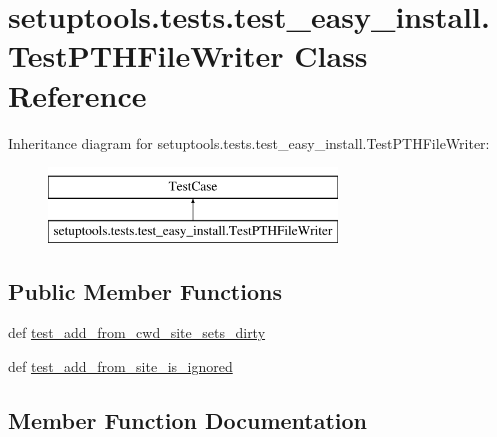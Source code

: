 \hypertarget{classsetuptools_1_1tests_1_1test__easy__install_1_1TestPTHFileWriter}{}\section{setuptools.\+tests.\+test\+\_\+easy\+\_\+install.\+Test\+P\+T\+H\+File\+Writer Class Reference}
\label{classsetuptools_1_1tests_1_1test__easy__install_1_1TestPTHFileWriter}
Inheritance diagram for setuptools.\+tests.\+test\+\_\+easy\+\_\+install.\+Test\+P\+T\+H\+File\+Writer\+:\begin{figure}[H]
\begin{center}
\leavevmode
\includegraphics[height=2.000000cm]{classsetuptools_1_1tests_1_1test__easy__install_1_1TestPTHFileWriter}
\end{center}
\end{figure}
\subsection*{Public Member Functions}
\begin{DoxyCompactItemize}
\item 
def \hyperlink{classsetuptools_1_1tests_1_1test__easy__install_1_1TestPTHFileWriter_af1db0ace301b29904737ff0a0896a729}{test\+\_\+add\+\_\+from\+\_\+cwd\+\_\+site\+\_\+sets\+\_\+dirty}
\item 
def \hyperlink{classsetuptools_1_1tests_1_1test__easy__install_1_1TestPTHFileWriter_ab6bb9d34f046af2cdf98ed6ff11f330f}{test\+\_\+add\+\_\+from\+\_\+site\+\_\+is\+\_\+ignored}
\end{DoxyCompactItemize}


\subsection{Member Function Documentation}
\hypertarget{classsetuptools_1_1tests_1_1test__easy__install_1_1TestPTHFileWriter_af1db0ace301b29904737ff0a0896a729}{}
